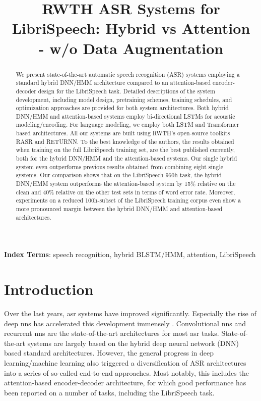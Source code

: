\documentclass[a4paper]{article}
\title{RWTH ASR Systems for LibriSpeech: Hybrid vs Attention\\ - w/o Data Augmentation}
\begin{document}
\maketitle
\begin{abstract}
We present state-of-the-art automatic speech recognition (ASR) systems employing a standard hybrid DNN/HMM architecture compared to an attention-based encoder-decoder design for the LibriSpeech task.
Detailed descriptions of the system development, including model design, pretraining schemes, training schedules, and optimization approaches are provided for both system architectures.
Both hybrid DNN/HMM and attention-based systems employ bi-directional LSTMs for acoustic modeling/encoding.
For language modeling, we employ both LSTM and Transformer based architectures.
All our systems are built using RWTH’s open-source toolkits RASR and RETURNN.
To the best knowledge of the authors, the results obtained when training on the full LibriSpeech training set, are the best published currently, both for the hybrid DNN/HMM and the attention-based systems.
Our single hybrid system even outperforms previous results obtained from combining eight single systems.
Our comparison shows that on the LibriSpeech 960h task, the hybrid DNN/HMM system outperforms the attention-based system by 15\% relative on the clean and 40\% relative on the other test sets in terms of word error rate.
Moreover, experiments on a reduced 100h-subset of the LibriSpeech training corpus even show a more pronounced margin between the hybrid DNN/HMM and attention-based architectures.

\end{abstract}
\noindent\textbf{Index Terms}: speech recognition, hybrid BLSTM/HMM, attention, LibriSpeech


\section{Introduction}
\label{sec:intro}

Over the last years, \ac{asr} systems have improved significantly.
Especially the rise of deep \acp{nn} has accelerated this development immensely \cite{hinton2012:deep}.
Convolutional \acp{nn} and recurrent \acp{nn} are the state-of-the-art architectures for most \ac{asr} tasks.
State-of-the-art systems are largely based on the hybrid deep neural network (DNN) based standard architectures.
However, the general progress in deep learning/machine learning also triggered a diversification of ASR architectures into a series of so-called end-to-end approaches.
Most notably, this includes the attention-based encoder-decoder architecture, for which good performance has been reported on a number of tasks, including the LibriSpeech task.
\end{document}
